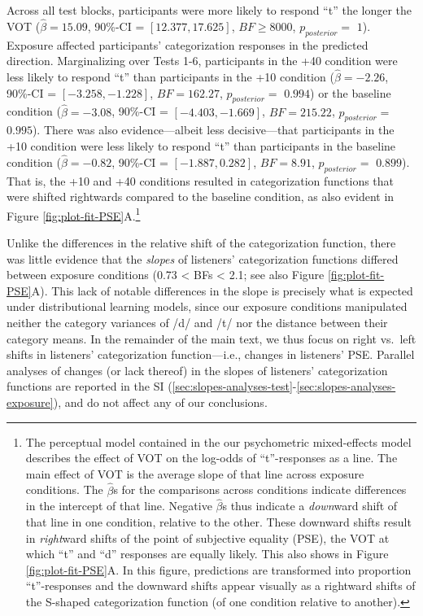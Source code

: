 \documentclass[
  11pt,
  man,mask,floatsintext]{apa6}
\begin{document}
Across all test blocks, participants were more likely to respond ``t'' the longer the VOT (\(\hat{\beta} = 15.09\), 90\%-CI = \([12.377, 17.625]\), \(BF \geq 8000\), \(p_{posterior} =\) \(1\)). Exposure affected participants' categorization responses in the predicted direction. Marginalizing over Tests 1-6, participants in the +40 condition were less likely to respond ``t'' than participants in the +10 condition (\(\hat{\beta} = -2.26\), 90\%-CI = \([-3.258, -1.228]\), \(BF = 162.27\), \(p_{posterior} =\) \(0.994\)) or the baseline condition (\(\hat{\beta} = -3.08\), 90\%-CI = \([-4.403, -1.669]\), \(BF = 215.22\), \(p_{posterior} =\) \(0.995\)). There was also evidence---albeit less decisive---that participants in the +10 condition were less likely to respond ``t'' than participants in the baseline condition (\(\hat{\beta} = -0.82\), 90\%-CI = \([-1.887, 0.282]\), \(BF = 8.91\), \(p_{posterior} =\) \(0.899\)). That is, the +10 and +40 conditions resulted in categorization functions that were shifted rightwards compared to the baseline condition, as also evident in Figure \ref{fig:plot-fit-PSE}A.\footnote{The perceptual model contained in the our psychometric mixed-effects model describes the effect of VOT on the log-odds of ``t''-responses as a line. The main effect of VOT is the average slope of that line across exposure conditions. The \(\hat{\beta}\)s for the comparisons across conditions indicate differences in the intercept of that line. Negative \(\hat{\beta}\)s thus indicate a \emph{down}ward shift of that line in one condition, relative to the other. These downward shifts result in \emph{right}ward shifts of the point of subjective equality (PSE), the VOT at which ``t'' and ``d'' responses are equally likely. This also shows in Figure \ref{fig:plot-fit-PSE}A. In this figure, predictions are transformed into proportion ``t''-responses and the downward shifts appear visually as a rightward shifts of the S-shaped categorization function (of one condition relative to another).}

Unlike the differences in the relative shift of the categorization function, there was little evidence that the \emph{slopes} of listeners' categorization functions differed between exposure conditions (0.73 \textless{} BFs \textless{} 2.1; see also Figure \ref{fig:plot-fit-PSE}A). This lack of notable differences in the slope is precisely what is expected under distributional learning models, since our exposure conditions manipulated neither the category variances of /d/ and /t/ nor the distance between their category means. In the remainder of the main text, we thus focus on right vs.~left shifts in listeners' categorization function---i.e., changes in listeners' PSE. Parallel analyses of changes (or lack thereof) in the slopes of listeners' categorization functions are reported in the SI (\ref{sec:slopes-analyses-test}-\ref{sec:slopes-analyses-exposure}), and do not affect any of our conclusions.
\end{document}
